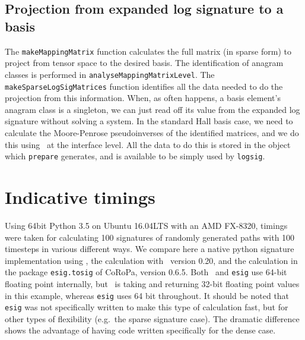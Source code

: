 \subsection{Projection from expanded log signature to a basis}
The \verb|makeMappingMatrix| function calculates the full matrix (in sparse form) to project from tensor space to the desired basis. The identification of anagram classes is performed in \verb|analyseMappingMatrixLevel|. The  \verb|makeSparseLogSigMatrices| function identifies all the data needed to do the projection from this information. When, as often happens, %
a basis element's anagram class is a singleton, we can just read off its value from the expanded log signature without solving a system. 
In the standard Hall basis case, we need to calculate the Moore-Penrose pseudoinverses of the identified matrices, and we do this using \numpy\ at the interface level. All the data to do this is stored in the %
object which \verb|prepare| generates, and is available to be simply used by \verb|logsig|.%

\section{Indicative timings}\label{sec:time}
Using 64bit Python 3.5 on Ubuntu 16.04LTS with an AMD FX-8320, timings were taken for calculating 100 signatures of randomly generated paths with 100 timesteps in various different ways. We compare here a native python signature implementation using \numpy, the calculation with \ii\ version 0.20,  and the calculation in the package \verb|esig.tosig| of CoRoPa\cite{coropa}, version 0.6.5. Both \ii\ and \verb|esig| use 64-bit floating point internally, but \ii\ is taking and returning 32-bit floating point values in this example, whereas \verb|esig| uses 64 bit throughout. %
It should be noted that \verb|esig| was not specifically written to make this type of calculation fast, but for other types of flexibility (e.g.~the sparse signature case). The dramatic difference shows the advantage of having code written specifically for the dense case. %
\newcolumntype{H}{>{\iffalse}c<{\fi}@{}} %

